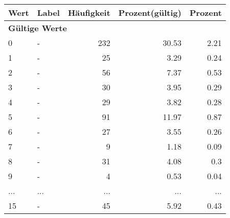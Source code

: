      \begin{longtable}{lXrrr}
     \toprule
     \textbf{Wert} & \textbf{Label} & \textbf{Häufigkeit} & \textbf{Prozent(gültig)} & \textbf{Prozent} \\
     \endhead
     \midrule
     \multicolumn{5}{l}{\textbf{Gültige Werte}}\\
        0 & \multicolumn{1}{X}{-} & %
          \num{232} &
          \num[round-mode=places,round-precision=2]{30,53} &
          \num[round-mode=places,round-precision=2]{2,21} \\
        1 & \multicolumn{1}{X}{-} & %
          \num{25} &
          \num[round-mode=places,round-precision=2]{3,29} &
          \num[round-mode=places,round-precision=2]{0,24} \\
        2 & \multicolumn{1}{X}{-} & %
          \num{56} &
          \num[round-mode=places,round-precision=2]{7,37} &
          \num[round-mode=places,round-precision=2]{0,53} \\
        3 & \multicolumn{1}{X}{-} & %
          \num{30} &
          \num[round-mode=places,round-precision=2]{3,95} &
          \num[round-mode=places,round-precision=2]{0,29} \\
        4 & \multicolumn{1}{X}{-} & %
          \num{29} &
          \num[round-mode=places,round-precision=2]{3,82} &
          \num[round-mode=places,round-precision=2]{0,28} \\
        5 & \multicolumn{1}{X}{-} & %
          \num{91} &
          \num[round-mode=places,round-precision=2]{11,97} &
          \num[round-mode=places,round-precision=2]{0,87} \\
        6 & \multicolumn{1}{X}{-} & %
          \num{27} &
          \num[round-mode=places,round-precision=2]{3,55} &
          \num[round-mode=places,round-precision=2]{0,26} \\
        7 & \multicolumn{1}{X}{-} & %
          \num{9} &
          \num[round-mode=places,round-precision=2]{1,18} &
          \num[round-mode=places,round-precision=2]{0,09} \\
        8 & \multicolumn{1}{X}{-} & %
          \num{31} &
          \num[round-mode=places,round-precision=2]{4,08} &
          \num[round-mode=places,round-precision=2]{0,3} \\
        9 & \multicolumn{1}{X}{-} & %
          \num{4} &
          \num[round-mode=places,round-precision=2]{0,53} &
          \num[round-mode=places,round-precision=2]{0,04} \\
       ... & ... & ... & ... & ... \\
        15 & \multicolumn{1}{X}{-} & %
          \num{45} &
          \num[round-mode=places,round-precision=2]{5,92} &
          \num[round-mode=places,round-precision=2]{0,43} \\


\end{longtable}
